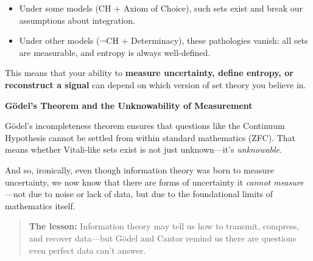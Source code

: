 \begin{itemize}
  \item Under some models (CH + Axiom of Choice), such sets exist and break our assumptions about integration.
  \item Under other models (¬CH + Determinacy), these pathologies vanish: all sets are measurable, and entropy is always well-defined.
\end{itemize}

This means that your ability to \textbf{measure uncertainty, define entropy, or reconstruct a signal} can depend on which version of set theory you believe in.

\vspace{1em}
\textbf{Gödel’s Theorem and the Unknowability of Measurement}

Gödel’s incompleteness theorem ensures that questions like the Continuum Hypothesis cannot be settled from within standard mathematics (ZFC). That means whether Vitali-like sets exist is not just unknown—it’s \emph{unknowable}.

And so, ironically, even though information theory was born to measure uncertainty, we now know that there are forms of uncertainty it \emph{cannot measure}—not due to noise or lack of data, but due to the foundational limits of mathematics itself.

\begin{quote}
\textbf{The lesson:} Information theory may tell us how to transmit, compress, and recover data—but Gödel and Cantor remind us there are questions even perfect data can’t answer.
\end{quote}


